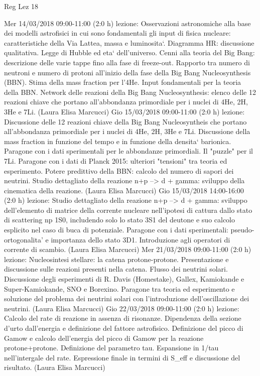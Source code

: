\begin{frame}[allowframebreaks]{Reg Lez 18}
\begin{itemize}
    Mer 14/03/2018 09:00-11:00 (2:0 h) lezione: Osservazioni astronomiche alla base dei modelli astrofisici in cui sono fondamentali gli input di fisica nucleare: caratteristiche della Via Lattea, massa e luminosita`. Diagramma HR: discussione qualitativa. Legge di Hubble ed eta` dell'universo. Cenni alla teoria del Big Bang: descrizione delle varie tappe fino alla fase di freeze-out. Rapporto tra numero di neutroni e numero di protoni all'inizio della fase della Big Bang Nucleosynthesis (BBN). Stima della mass fraction per l'4He. Input fondamentali per la teoria della BBN. Network delle reazioni della Big Bang Nucleosynthesis: elenco delle 12 reazioni chiave che portano all'abbondanza primordiale per i nuclei di 4He, 2H, 3He e 7Li. (Laura Elisa Marcucci)
    Gio 15/03/2018 09:00-11:00 (2:0 h) lezione: Discussione delle 12 reazioni chiave della Big Bang Nucleosyntheis che portano all'abbondanza primordiale per i nuclei di 4He, 2H, 3He e 7Li. Discussione della mass fraction in funzione del tempo e in funzione della densita` barionica. Paragone con i dati sperimentali per le abbondanze primordiali. Il "puzzle" per il 7Li. Paragone con i dati di Planck 2015: ulteriori "tensioni" tra teoria ed esperimento. Potere predittivo della BBN: calcolo del numero di sapori dei neutrini. Studio dettagliato della reazione n+p --> d + gamma: sviluppo della cinematica della reazione. (Laura Elisa Marcucci)
    Gio 15/03/2018 14:00-16:00 (2:0 h) lezione: Studio dettagliato della reazione n+p --> d + gamma: sviluppo dell'elemento di matrice della corrente nucleare nell'ipotesi di cattura dallo stato di scattering np 1S0, includendo solo lo stato 3S1 del deutone e suo calcolo esplicito nel caso di buca di potenziale. Paragone con i dati sperimentali: pseudo-ortogonalita' e importanza dello stato 3D1. Introduzione agli operatori di corrente di scambio. (Laura Elisa Marcucci)
    Mer 21/03/2018 09:00-11:00 (2:0 h) lezione: Nucleosintesi stellare: la catena protone-protone. Presentazione e discussione sulle reazioni presenti nella catena. Flusso dei neutrini solari. Discussione degli esperimenti di R. Davis (Homestake), Gallex, Kamiokande e Super-Kamiokande, SNO e Borexino. Paragone tra teoria ed esperimento e soluzione del problema dei neutrini solari con l'introduzione dell'oscillazione dei neutrini. (Laura Elisa Marcucci)
    Gio 22/03/2018 09:00-11:00 (2:0 h) lezione: Calcolo del rate di reazione in assenza di risonanze. Dipendenza della sezione d'urto dall'energia e definizione del fattore astrofisico. Definizione del picco di Gamow e calcolo dell'energia del picco di Gamow per la reazione protone+protone. Definizione del parametro tau. Espansione in 1/tau nell'intergale del rate. Espressione finale in termini di S_eff e discussione del risultato. (Laura Elisa Marcucci)

\end{itemize}
\end{frame}

